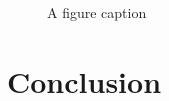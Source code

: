 \documentclass[a4paper,12pt,oneside,final]{report}
\newenvironment{changemargin}[2]{\begin{list}{}{%
\setlength{\topsep}{0pt}%
\setlength{\leftmargin}{0pt}%
\setlength{\rightmargin}{0pt}%
\setlength{\listparindent}{\parindent}%
\setlength{\itemindent}{\parindent}%
\setlength{\parsep}{0pt plus 1pt}%
\addtolength{\leftmargin}{#1}%
\addtolength{\rightmargin}{#2}%
}\item }{\end{list}}
\begin{document}
\paragraph{}


\begin{figure}[!h]
\begin{changemargin}{-20mm}{-20mm}
\center
\caption{A figure caption}
\end{changemargin}
\end{figure}

\paragraph{}
\chapter{Conclusion}
\paragraph{}




\begin{appendices}

\end{appendices}
\end{document}
